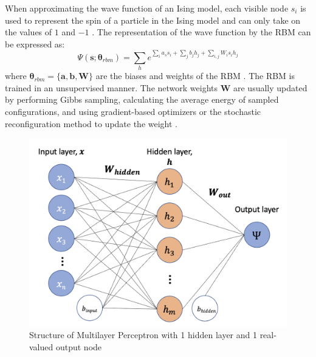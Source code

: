 When approximating the wave function of an Ising model, each visible node $s_i$ is used to represent the spin of a particle in the Ising model and can only take on the values of $1$ and $-1$ \cite{b20}. The representation of the wave function by the RBM can be expressed as:
\begin{equation}
    \Psi(\boldsymbol{s} ; \boldsymbol{\theta}_{rbm}) = \sum_{h} e^{\sum_i a_s s_i + \sum_j b_j h_j + \sum_{i,j}W_i s_i h_j} 
\end{equation}
where  $\boldsymbol{\theta}_{rbm} = \{\boldsymbol{a}, \boldsymbol{b}, \boldsymbol{W}\}$ are the biases and weights of the RBM \cite{b20}. The RBM is trained in an unsupervised manner. The network weights $\mathbf{W}$ are usually updated by performing Gibbs sampling, calculating the average energy of sampled configurations, and using gradient-based optimizers or the stochastic reconfiguration method to update the weight \cite{b25}.

\begin{figure}[h!]
    \centering
    \includegraphics[width=0.7\linewidth]{images/mlp_diagram.png}
    \caption{Structure of Multilayer Perceptron with 1 hidden layer and 1 real-valued output node}
    \label{rbmstructure}
\end{figure}

